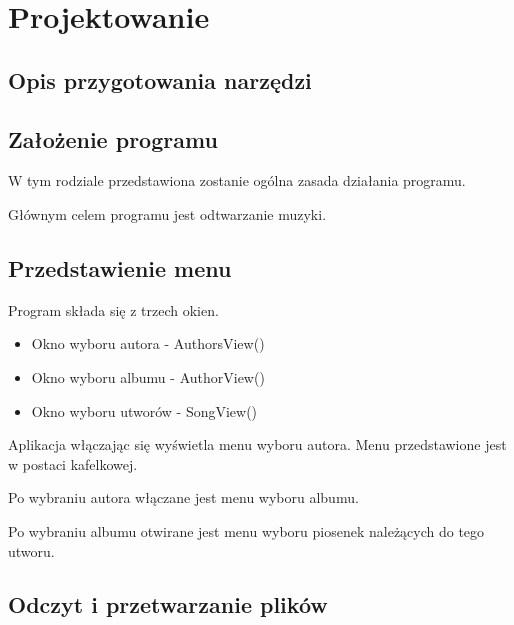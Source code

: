 	\newpage
\section{Projektowanie}		%

\subsection{Opis przygotowania narzędzi}

\subsection{Założenie programu}
W tym rodziale przedstawiona zostanie ogólna zasada działania programu.

Głównym celem programu jest odtwarzanie muzyki.

\subsection{Przedstawienie menu}

Program składa się z trzech okien.

\begin{itemize}
	\item Okno wyboru autora - AuthorsView()
	\item Okno wyboru albumu - AuthorView()
	\item Okno wyboru utworów - SongView()
\end{itemize}

Aplikacja włączając się wyświetla menu wyboru autora. Menu przedstawione jest w postaci kafelkowej.

Po wybraniu autora włączane jest menu wyboru albumu.

Po wybraniu albumu otwirane jest menu wyboru piosenek należących do tego utworu.

\subsection{Odczyt i przetwarzanie plików}

